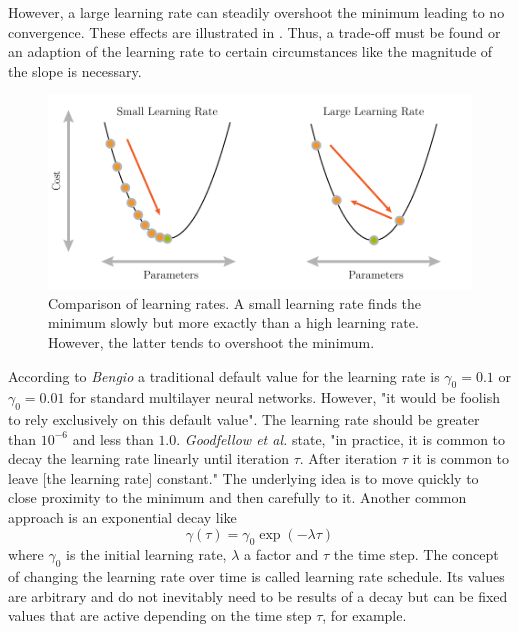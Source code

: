 However, a large learning rate can steadily overshoot the minimum leading to no convergence.
These effects are illustrated in .
Thus, a trade-off must be found or an adaption of the learning rate to certain circumstances like the magnitude of the slope is necessary.
\begin{figure}
	\centering
	\includegraphics[]{images/gradient_descent_learning_rate.pdf}
	\caption[Comparison of learning rates]{Comparison of learning rates. A small learning rate finds the minimum slowly but more exactly than a high learning rate. However, the latter tends to overshoot the minimum.}
	\label{fig:learning-rate}
\end{figure}
According to \textit{Bengio} \cite{DBLP:journals/corr/abs-1206-5533} a traditional default value for the learning rate is $\gamma_0 = 0.1$ or $\gamma_0 = 0.01$ for standard multilayer neural networks.
However, "it would be foolish to rely exclusively on this default value".
The learning rate should be greater than $10^{-6}$ and less than $1.0$.
\textit{Goodfellow et al.} \cite{Goodfellow-et-al-2016} state, "in practice, it is common to decay the learning rate linearly until iteration $\tau$. After iteration $\tau$ it is common to leave [the learning rate] constant."
The underlying idea is to move quickly to close proximity to the minimum and then carefully to it.
Another common approach is an exponential decay like
\begin{equation}
	\gamma(\tau) = \gamma_0 \exp(-\lambda\tau)
\end{equation}
where $\gamma_0$ is the initial learning rate, $\lambda$ a factor and $\tau$ the time step.
The concept of changing the learning rate over time is called learning rate schedule. Its values are arbitrary and do not inevitably need to be results of a decay but can be fixed values that are active depending on the time step $\tau$, for example.

